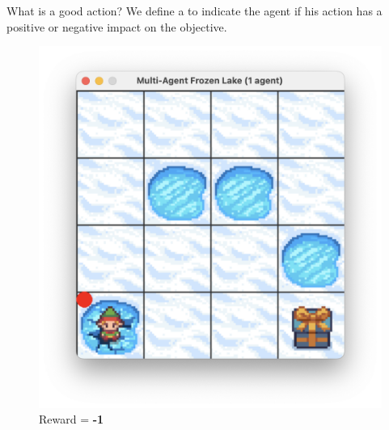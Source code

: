 \documentclass[aspectratio=169,xcolor=dvipsnames]{beamer}
\begin{document}

\begin{frame}{What is a good action?}
    We define a   to indicate the agent if his action has a positive or negative impact on the objective.

    \begin{figure}[h!]
        \centering
        \begin{minipage}{0.45\textwidth} 
            \centering
            \includegraphics[scale=0.3]{images/fallen-agent.png}
            \caption{Reward = \textbf{-1}}
        \end{minipage}%
        \begin{minipage}{0.45\textwidth} 
            \centering

\end{minipage}
\end{figure}
\end{frame}
\end{document}
